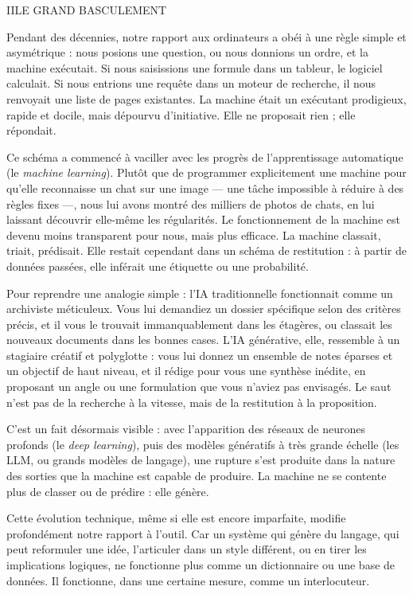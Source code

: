 \begin{partdivider}{II}{LE GRAND BASCULEMENT}\end{partdivider}


Pendant des décennies, notre rapport aux ordinateurs a obéi à une règle simple et asymétrique : nous posions une question, ou nous donnions un ordre, et la machine exécutait. Si nous saisissions une formule dans un tableur, le logiciel calculait. Si nous entrions une requête dans un moteur de recherche, il nous renvoyait une liste de pages existantes. La machine était un exécutant prodigieux, rapide et docile, mais dépourvu d'initiative. Elle ne proposait rien ; elle répondait.

Ce schéma a commencé à vaciller avec les progrès de l'apprentissage automatique (le \emph{machine learning}). Plutôt que de programmer explicitement une machine pour qu'elle reconnaisse un chat sur une image — une tâche impossible à réduire à des règles fixes —, nous lui avons montré des milliers de photos de chats, en lui laissant découvrir elle-même les régularités. Le fonctionnement de la machine est devenu moins transparent pour nous, mais plus efficace. La machine classait, triait, prédisait. Elle restait cependant dans un schéma de restitution : à partir de données passées, elle inférait une étiquette ou une probabilité.

Pour reprendre une analogie simple : l'IA traditionnelle fonctionnait comme un archiviste méticuleux. Vous lui demandiez un dossier spécifique selon des critères précis, et il vous le trouvait immanquablement dans les étagères, ou classait les nouveaux documents dans les bonnes cases. L'IA générative, elle, ressemble à un stagiaire créatif et polyglotte : vous lui donnez un ensemble de notes éparses et un objectif de haut niveau, et il rédige pour vous une synthèse inédite, en proposant un angle ou une formulation que vous n'aviez pas envisagés. Le saut n'est pas de la recherche à la vitesse, mais de la restitution à la proposition.

C'est un fait désormais visible : avec l'apparition des réseaux de neurones profonds (le \emph{deep learning}), puis des modèles génératifs à très grande échelle (les LLM, ou grands modèles de langage), une rupture s'est produite dans la nature des sorties que la machine est capable de produire. La machine ne se contente plus de classer ou de prédire : elle génère.

Cette évolution technique, même si elle est encore imparfaite, modifie profondément notre rapport à l'outil. Car un système qui génère du langage, qui peut reformuler une idée, l'articuler dans un style différent, ou en tirer les implications logiques, ne fonctionne plus comme un dictionnaire ou une base de données. Il fonctionne, dans une certaine mesure, comme un interlocuteur.

